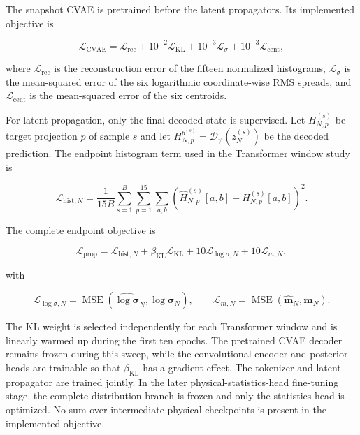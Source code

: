 The snapshot CVAE is pretrained before the latent propagators. Its implemented objective is

\begin{equation}
\label{eq:157}
\mathcal L_{\mathrm{CVAE}}=\mathcal L_{\mathrm{rec}}+10^{-2}\mathcal L_{\mathrm{KL}}+10^{-3}\mathcal L_{\sigma}+10^{-3}\mathcal L_{\mathrm{cent}},
\end{equation}

where \(\mathcal{L}_{\mathrm{rec}}\) is the reconstruction error of the fifteen normalized histograms, \(\mathcal{L}_{\sigma}\) is the mean-squared error of the six logarithmic coordinate-wise RMS spreads, and \(\mathcal{L}_{\mathrm{cent}}\) is the mean-squared error of the six centroids.

For latent propagation, only the final decoded state is supervised. Let \(H_{N , p}^{( s )}\) be target projection \(p\) of sample \(s\) and let \(H_{N , p}^{b^{( s )}} = \mathcal{D}_{\psi} ( z_{N}^{( s )} )\) be the decoded prediction. The endpoint histogram term used in the Transformer window study is

\begin{equation}
\label{eq:158}
\mathcal L_{\mathrm{hist},N}=\frac1{15B}\sum_{s=1}^{B}\sum_{p=1}^{15}\sum_{a,b}\left(\widehat H_{N,p}^{(s)}[a,b]-H_{N,p}^{(s)}[a,b]\right)^2.
\end{equation}

The complete endpoint objective is

\begin{equation}
\label{eq:159}
\mathcal L_{\mathrm{prop}}=\mathcal L_{\mathrm{hist},N}+\beta_{\mathrm{KL}}\mathcal L_{\mathrm{KL}}+10\mathcal L_{\log\sigma,N}+10\mathcal L_{m,N},
\end{equation}

with

\begin{equation}
\label{eq:160}
\mathcal L_{\log\sigma,N}=\operatorname{MSE}(\widehat{\log\boldsymbol\sigma}_N,\log\boldsymbol\sigma_N),\qquad\mathcal L_{m,N}=\operatorname{MSE}(\widehat{\mathbf m}_N,\mathbf m_N).
\end{equation}

The KL weight is selected independently for each Transformer window and is linearly warmed up during the first ten epochs. The pretrained CVAE decoder remains frozen during this sweep, while the convolutional encoder and posterior heads are trainable so that \(\beta_{\mathrm{KL}}\) has a gradient effect. The tokenizer and latent propagator are trained jointly. In the later physical-statistics-head fine-tuning stage, the complete distribution branch is frozen and only the statistics head is optimized. No sum over intermediate physical checkpoints is present in the implemented objective.

